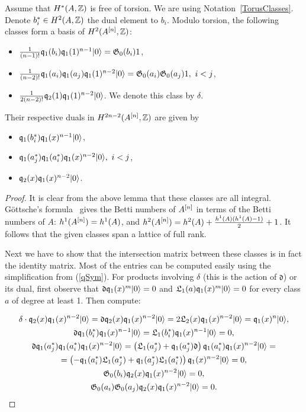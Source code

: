\begin{proposition} Assume that $H^*(A,\mathbb{Z})$ is free of torsion.
We are using Notation~\ref{TorusClasses}. Denote $b_i^*\in H^2(A,\mathbb{Z})$ the dual element to $b_i$. 
Modulo torsion, the following classes form a basis of $H^2(A^{[n]},\mathbb{Z})$:
\begin{itemize}
 \item[] $\frac{1}{(n-1)!}\mathfrak{q}_{1}(b_{i})\mathfrak{q}_{1}(1)^{n-1}|0\rangle = \mathfrak{G}_0(b_i) 1$,
 \item[] $ \frac{1}{(n-2)!}\mathfrak{q}_{1}(a_{i})\mathfrak{q}_{1}(a_{j})\mathfrak{q}_{1}(1)^{n-2}|0\rangle = \mathfrak{G}_0(a_i) \mathfrak{G}_0(a_j)1,\  i < j$, 
 \item[] $ \frac{1}{2(n-2)!}\mathfrak{q}_{2}(1) \mathfrak{q}_{1}(1)^{n-2}|0\rangle$. We denote this class by $\delta$.
\end{itemize}
Their respective duals in $H^{2n-2}(A^{[n]},\mathbb{Z})$ are given by
\begin{itemize}
 \item[] $\mathfrak{q}_{1}(b_{i}^*)\mathfrak{q}_{1}(x)^{n-1}|0\rangle$,
 \item[] $\mathfrak{q}_{1}(a_{j}^*)\mathfrak{q}_{1}(a_{i}^*)\mathfrak{q}_{1}(x)^{n-2}|0\rangle,\  i < j$,
 \item[] $\mathfrak{q}_2(x)\mathfrak{q}_{1}(x)^{n-2} |0\rangle$.
\end{itemize}
\end{proposition}
\begin{proof} It is clear from the above lemma that these classes are all integral.
G\"ottsche's formula~\cite[p.~35]{Gottsche} gives the Betti numbers of $A^{[n]}$ in terms of the Betti numbers of $A$: 
$h^1(A^{[n]}) = h^1(A)$, and $h^2(A^{[n]}) = h^2(A)+ \frac{h^1(A)(h^1(A)-1)}{2} + 1$. It follows that the given classes span a lattice of full rank.

Next we have to show that the intersection matrix between these classes is in fact the identity matrix. Most of the entries can be computed easily using the simplification from (\ref{qSym}). For products involving $\delta$ (this is the action of $\mathfrak{d}$) or its dual, first observe that $\mathfrak{d}\mathfrak{q}_1(x)^m|0\rangle = 0 $ and $ \mathfrak{L}_1(a)\mathfrak{q}_1(x)^m|0\rangle =0$ for every class $a$ of degree at least 1. Then compute:

\begin{gather*}
\delta \cdot\mathfrak{q}_2(x)\mathfrak{q}_{1}(x)^{n-2} |0\rangle = \mathfrak{d}\mathfrak{q}_2(x)\mathfrak{q}_{1}(x)^{n-2} |0\rangle = 2 \mathfrak{L}_2(x) \mathfrak{q}_{1}(x)^{n-2} |0\rangle = \mathfrak{q}_{1}(x)^{n}|0\rangle,
\\
\mathfrak{d}\mathfrak{q}_{1}(b_{i}^*)\mathfrak{q}_{1}(x)^{n-1}|0\rangle =  \mathfrak{L}_1(b_i^*) \mathfrak{q}_{1}(x)^{n-1} |0\rangle = 0,
\\
\mathfrak{d}\mathfrak{q}_{1}(a_{j}^*)\mathfrak{q}_{1}(a_{i}^*)\mathfrak{q}_{1}(x)^{n-2}|0\rangle = \left(\mathfrak{L}_1(a_j^*) +\mathfrak{q}_{1}(a_{j}^*)\mathfrak{d}\right)\mathfrak{q}_{1}(a_{i}^*)\mathfrak{q}_{1}(x)^{n-2}|0\rangle = 
  \\ =\left(-\mathfrak{q}_1(a_i^*)\mathfrak{L}_1(a_j^*) + \mathfrak{q}_{1}(a_{j}^*)\mathfrak{L}_1(a_i^*)\right)\mathfrak{q}_{1}(x)^{n-2}|0\rangle  = 0,
\\
\mathfrak{G}_0(b_i)\mathfrak{q}_2(x)\mathfrak{q}_{1}(x)^{n-2} |0\rangle = 0, 
\\
\mathfrak{G}_0(a_i)\mathfrak{G}_0(a_j)\mathfrak{q}_2(x)\mathfrak{q}_{1}(x)^{n-2} |0\rangle = 0.
\end{gather*}


\end{proof}

